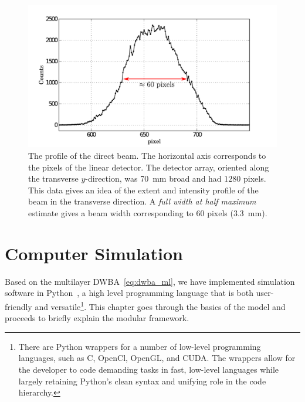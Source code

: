 \documentclass[10pt,twoside, b5paper,pdftex]{report}
\begin{document}
\begin{figure}[htbp]
	\begin{center}
		\includegraphics[width=1.2\textwidth]{figures/profile.pdf}
	\end{center}
	\caption{The profile of the direct beam. The horizontal axis corresponds to the pixels of the linear detector. The detector array, oriented along the transverse $y$-direction, was \SI{70}{\milli\meter} broad and had $1280$ pixels. This data gives an idea of the extent and intensity profile of the beam in the transverse direction. A {\it full width at half maximum} estimate gives a beam width corresponding to $60$ pixels (\SI{3.3}{\milli\meter}).  \label{fig:matrix_just_00048}}
\end{figure}





\chapter{Computer Simulation}
Based on the multilayer DWBA~\cref{eq:dwba_ml}, we have implemented simulation software in Python~\cite{OLIPHANT}, a high level programming language that is both user-friendly and versatile\footnote{There are Python wrappers for a number of low-level programming languages, such as C, OpenCl, OpenGL, and CUDA. The wrappers allow for the developer to code demanding tasks in fast, low-level languages while largely retaining Python's clean syntax and unifying role in the code hierarchy.}.
This chapter goes through the basics of the model and proceeds to briefly explain the modular framework.  
  
\end{document}
